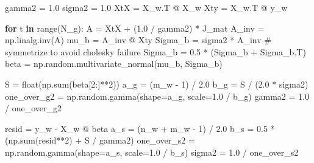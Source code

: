 \documentclass[
  letterpaper,
  DIV=11,
  numbers=noendperiod]{scrartcl}
\newenvironment{Shaded}{\begin{snugshade}}{\end{snugshade}}
\newcommand{\BuiltInTok}[1]{\textcolor[rgb]{0.00,0.23,0.31}{#1}}
\newcommand{\CommentTok}[1]{\textcolor[rgb]{0.37,0.37,0.37}{#1}}
\newcommand{\ControlFlowTok}[1]{\textcolor[rgb]{0.00,0.23,0.31}{\textbf{#1}}}
\newcommand{\DecValTok}[1]{\textcolor[rgb]{0.68,0.00,0.00}{#1}}
\newcommand{\FloatTok}[1]{\textcolor[rgb]{0.68,0.00,0.00}{#1}}
\newcommand{\KeywordTok}[1]{\textcolor[rgb]{0.00,0.23,0.31}{\textbf{#1}}}
\newcommand{\NormalTok}[1]{\textcolor[rgb]{0.00,0.23,0.31}{#1}}
\newcommand{\OperatorTok}[1]{\textcolor[rgb]{0.37,0.37,0.37}{#1}}
\begin{document}
\begin{Shaded}
\begin{Highlighting}[]
\NormalTok{gamma2 }\OperatorTok{=} \FloatTok{1.0}
\NormalTok{sigma2 }\OperatorTok{=} \FloatTok{1.0}
\NormalTok{XtX }\OperatorTok{=}\NormalTok{ X\_w.T }\OperatorTok{@}\NormalTok{ X\_w}
\NormalTok{Xty }\OperatorTok{=}\NormalTok{ X\_w.T }\OperatorTok{@}\NormalTok{ y\_w}

\ControlFlowTok{for}\NormalTok{ t }\KeywordTok{in} \BuiltInTok{range}\NormalTok{(N\_g):}
\NormalTok{    A }\OperatorTok{=}\NormalTok{ XtX }\OperatorTok{+}\NormalTok{ (}\FloatTok{1.0} \OperatorTok{/}\NormalTok{ gamma2) }\OperatorTok{*}\NormalTok{ J\_mat}
\NormalTok{    A\_inv }\OperatorTok{=}\NormalTok{ np.linalg.inv(A)}
\NormalTok{    mu\_b }\OperatorTok{=}\NormalTok{ A\_inv }\OperatorTok{@}\NormalTok{ Xty}
\NormalTok{    Sigma\_b }\OperatorTok{=}\NormalTok{ sigma2 }\OperatorTok{*}\NormalTok{ A\_inv}
    \CommentTok{\# symmetrize to avoid cholesky failure}
\NormalTok{    Sigma\_b }\OperatorTok{=} \FloatTok{0.5} \OperatorTok{*}\NormalTok{ (Sigma\_b }\OperatorTok{+}\NormalTok{ Sigma\_b.T)}
\NormalTok{    beta }\OperatorTok{=}\NormalTok{ np.random.multivariate\_normal(mu\_b, Sigma\_b)}

\NormalTok{    S }\OperatorTok{=} \BuiltInTok{float}\NormalTok{(np.}\BuiltInTok{sum}\NormalTok{(beta[}\DecValTok{2}\NormalTok{:]}\OperatorTok{**}\DecValTok{2}\NormalTok{))}
\NormalTok{    a\_g }\OperatorTok{=}\NormalTok{ (m\_w }\OperatorTok{{-}} \DecValTok{1}\NormalTok{) }\OperatorTok{/} \FloatTok{2.0}
\NormalTok{    b\_g }\OperatorTok{=}\NormalTok{ S }\OperatorTok{/}\NormalTok{ (}\FloatTok{2.0} \OperatorTok{*}\NormalTok{ sigma2)}
\NormalTok{    one\_over\_g2 }\OperatorTok{=}\NormalTok{ np.random.gamma(shape}\OperatorTok{=}\NormalTok{a\_g, scale}\OperatorTok{=}\FloatTok{1.0} \OperatorTok{/}\NormalTok{ b\_g)}
\NormalTok{    gamma2 }\OperatorTok{=} \FloatTok{1.0} \OperatorTok{/}\NormalTok{ one\_over\_g2}

\NormalTok{    resid }\OperatorTok{=}\NormalTok{ y\_w }\OperatorTok{{-}}\NormalTok{ X\_w }\OperatorTok{@}\NormalTok{ beta}
\NormalTok{    a\_s }\OperatorTok{=}\NormalTok{ (n\_w }\OperatorTok{+}\NormalTok{ m\_w }\OperatorTok{{-}} \DecValTok{1}\NormalTok{) }\OperatorTok{/} \FloatTok{2.0}
\NormalTok{    b\_s }\OperatorTok{=} \FloatTok{0.5} \OperatorTok{*}\NormalTok{ (np.}\BuiltInTok{sum}\NormalTok{(resid}\OperatorTok{**}\DecValTok{2}\NormalTok{) }\OperatorTok{+}\NormalTok{ S }\OperatorTok{/}\NormalTok{ gamma2)}
\NormalTok{    one\_over\_s2 }\OperatorTok{=}\NormalTok{ np.random.gamma(shape}\OperatorTok{=}\NormalTok{a\_s, scale}\OperatorTok{=}\FloatTok{1.0} \OperatorTok{/}\NormalTok{ b\_s)}
\NormalTok{    sigma2 }\OperatorTok{=} \FloatTok{1.0} \OperatorTok{/}\NormalTok{ one\_over\_s2}


\end{Highlighting}
\end{Shaded}
\end{document}
